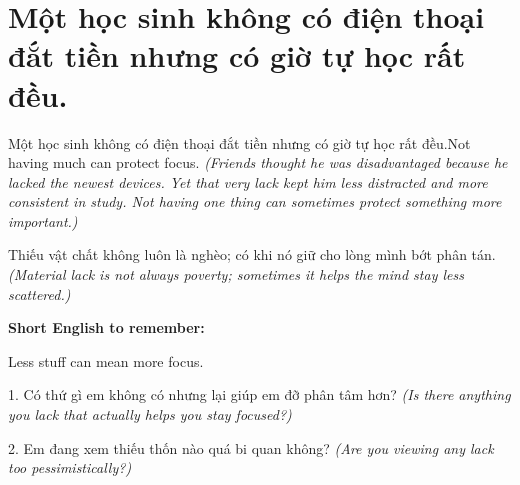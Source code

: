 \section{Một học sinh không có điện thoại đắt tiền nhưng có giờ tự học rất đều.}
\begin{truyen}{Một học sinh không có điện thoại đắt tiền nhưng có giờ tự học rất đều.}{Not having much can protect focus.}
\textit{(Friends thought he was disadvantaged because he lacked the newest devices. Yet that very lack kept him less distracted and more consistent in study. Not having one thing can sometimes protect something more important.)}
\end{truyen}
\begin{baihoc}
Thiếu vật chất không luôn là nghèo; có khi nó giữ cho lòng mình bớt phân tán.
\textit{(Material lack is not always poverty; sometimes it helps the mind stay less scattered.)}
\end{baihoc}
\begin{ghinhoanh}
\textbf{Short English to remember:}

Less stuff can mean more focus.
\end{ghinhoanh}
\begin{tuhocnhanh}
1. Có thứ gì em không có nhưng lại giúp em đỡ phân tâm hơn? \textit{(Is there anything you lack that actually helps you stay focused?)}

2. Em đang xem thiếu thốn nào quá bi quan không? \textit{(Are you viewing any lack too pessimistically?)}
\end{tuhocnhanh}
\ngancach

